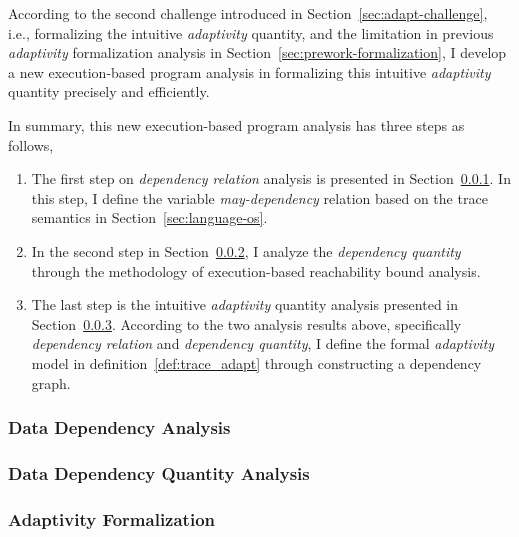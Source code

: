 According to the second challenge introduced in Section~\ref{sec:adapt-challenge},
i.e., formalizing the intuitive \emph{adaptivity} quantity,
and the limitation in previous \emph{adaptivity} formalization analysis in Section~\ref{sec:prework-formalization},
I develop a new execution-based program analysis in formalizing this intuitive \emph{adaptivity} quantity
precisely and efficiently.
%

In summary, this new execution-based program analysis has three steps as follows,
\begin{enumerate}
\item The first step on \emph{dependency relation} analysis is presented in Section~\ref{sec:dynamic-datadep}.
In this step, I define the variable \emph{may-dependency} relation based on the trace semantics in Section~\ref{sec:language-os}.
\item In the second step in Section~\ref{sec:dynamic-reachability}, I analyze the \emph{dependency quantity} through the methodology of execution-based reachability bound analysis.
\item The last step is the intuitive \emph{adaptivity} quantity analysis presented in Section~\ref{sec:dynamic-adapt}.
According to the two analysis results above, specifically \emph{dependency relation} and \emph{dependency quantity},
I define the formal \emph{adaptivity} model in definition~\ref{def:trace_adapt} through 
constructing a dependency graph.
\end{enumerate}

\subsubsection{Data Dependency Analysis}
\label{sec:dynamic-datadep}


\subsubsection{Data Dependency Quantity Analysis}
\label{sec:dynamic-reachability}
%
\subsubsection{Adaptivity Formalization}
\label{sec:dynamic-adapt}
%
%
% 
%

% 
%
%